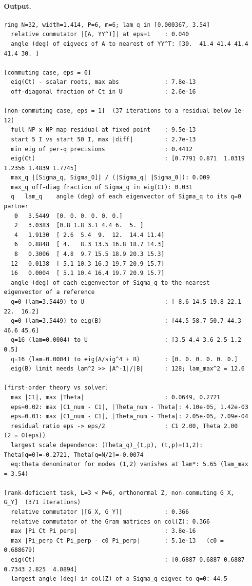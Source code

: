 \documentclass[11pt,a4paper]{article}
\begin{document}
\paragraph{Output.}
{\scriptsize
\begin{verbatim}
ring N=32, width=1.414, P=6, m=6; lam_q in [0.000367, 3.54]
  relative commutator |[A, YY^T]| at eps=1    : 0.040
  angle (deg) of eigvecs of A to nearest of YY^T: [30.  41.4 41.4 41.4 41.4 30. ]

[commuting case, eps = 0]
  eig(Ct) - scalar roots, max abs             : 7.8e-13
  off-diagonal fraction of Ct in U            : 2.6e-16

[non-commuting case, eps = 1]  (37 iterations to a residual below 1e-12)
  full NP x NP map residual at fixed point    : 9.5e-13
  start 5 I vs start 50 I, max |diff|         : 2.7e-13
  min eig of per-q precisions                 : 0.4412
  eig(Ct)                                     : [0.7791 0.871  1.0319 1.2356 1.4839 1.7745]
  max_q |[Sigma_q, Sigma_0]| / (|Sigma_q| |Sigma_0|): 0.009
  max_q off-diag fraction of Sigma_q in eig(Ct): 0.031
  q   lam_q    angle (deg) of each eigenvector of Sigma_q to its q=0 partner
   0   3.5449  [0. 0. 0. 0. 0. 0.]
   2   3.0383  [0.8 1.8 3.1 4.4 6.  5. ]
   4   1.9130  [ 2.6  5.4  9.  12.  14.4 11.4]
   6   0.8848  [ 4.   8.3 13.5 16.8 18.7 14.3]
   8   0.3006  [ 4.8  9.7 15.5 18.9 20.3 15.3]
  12   0.0138  [ 5.1 10.3 16.3 19.7 20.9 15.7]
  16   0.0004  [ 5.1 10.4 16.4 19.7 20.9 15.7]
  angle (deg) of each eigenvector of Sigma_q to the nearest eigenvector of a reference
  q=0 (lam=3.5449) to U                       : [ 8.6 14.5 19.8 22.1 22.  16.2]
  q=0 (lam=3.5449) to eig(B)                  : [44.5 58.7 50.7 44.3 46.6 45.6]
  q=16 (lam=0.0004) to U                      : [3.5 4.4 3.6 2.5 1.2 0.5]
  q=16 (lam=0.0004) to eig(A/sig^4 + B)       : [0. 0. 0. 0. 0. 0.]
  eig(B) limit needs lam^2 >> |A^-1|/|B|      : 128; lam_max^2 = 12.6

[first-order theory vs solver]
  max |C1|, max |Theta|                       : 0.0649, 0.2721
  eps=0.02: max |C1_num - C1|, |Theta_num - Theta|: 4.10e-05, 1.42e-03
  eps=0.01: max |C1_num - C1|, |Theta_num - Theta|: 2.05e-05, 7.09e-04
  residual ratio eps -> eps/2                 : C1 2.00, Theta 2.00  (2 = O(eps))
  largest scale dependence: (Theta_q)_(t,p), (t,p)=(1,2): Theta[q=0]=-0.2721, Theta[q=N/2]=-0.0074
  eq:theta denominator for modes (1,2) vanishes at lam*: 5.65 (lam_max = 3.54)

[rank-deficient task, L=3 < P=6, orthonormal Z, non-commuting G_X, G_Y]  (371 iterations)
  relative commutator |[G_X, G_Y]|            : 0.366
  relative commutator of the Gram matrices on col(Z): 0.366
  max |Pi Ct Pi_perp|                         : 3.8e-16
  max |Pi_perp Ct Pi_perp - c0 Pi_perp|       : 5.1e-13   (c0 = 0.688679)
  eig(Ct)                                     : [0.6887 0.6887 0.6887 0.7343 2.825  4.0894]
  largest angle (deg) in col(Z) of a Sigma_q eigvec to q=0: 44.5


\end{verbatim}}
\end{document}
